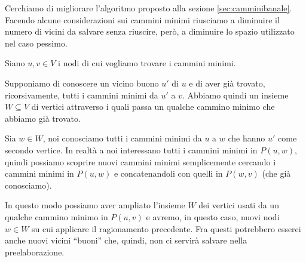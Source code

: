 \documentclass[a4paper,10pt]{amsbook}
\theoremstyle{plain}
\theoremstyle{definition}
\theoremstyle{remark}
\begin{document}
Cerchiamo di migliorare l'algoritmo proposto alla sezione
\ref{sec:camminibanale}. Facendo alcune considerazioni sui cammini
minimi riusciamo a diminuire il numero di vicini da salvare senza
riuscire, per\`o, a diminuire lo spazio utilizzato nel caso pessimo.

Siano $u,v\in V$ i nodi di cui vogliamo trovare i cammini minimi.

Supponiamo di conoscere un vicino buono $u'$ di $u$ e di aver gi\`a
trovato, ricorsivamente, tutti i cammini minimi da $u'$ a $v$. Abbiamo
quindi un insieme $W \subseteq V$ di vertici attraverso i quali passa
un qualche cammino minimo che abbiamo gi\`a trovato.

Sia $w \in W$, noi conosciamo tutti i cammini minimi da $u$ a $w$ che
hanno $u'$ come secondo vertice. In realt\`a a noi interessano tutti i
cammini minimi in $P(u,w)$, quindi possiamo scoprire nuovi cammini
minimi semplicemente cercando i cammini minimi in $P(u,w)$ e
concatenandoli con quelli in $P(w,v)$ (che gi\`a conosciamo).

In questo modo possiamo aver ampliato l'insieme $W$ dei vertici usati
da un qualche cammino minimo in $P(u,v)$ e avremo, in questo caso,
nuovi nodi $w\in W$ su cui applicare il ragionamento precedente. Fra
questi potrebbero esserci anche nuovi vicini ``buoni'' che, quindi,
non ci servir\`a salvare nella preelaborazione.
\end{document}

